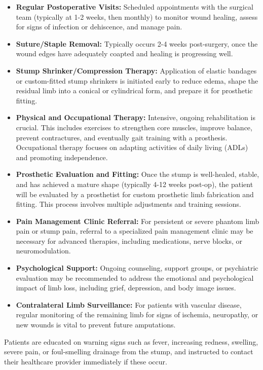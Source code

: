 \begin{itemize}
  \item \textbf{Regular Postoperative Visits:} Scheduled appointments with the surgical team (typically at 1-2 weeks, then monthly) to monitor wound healing, assess for signs of infection or dehiscence, and manage pain.
  \item \textbf{Suture/Staple Removal:} Typically occurs 2-4 weeks post-surgery, once the wound edges have adequately coapted and healing is progressing well.
  \item \textbf{Stump Shrinker/Compression Therapy:} Application of elastic bandages or custom-fitted stump shrinkers is initiated early to reduce edema, shape the residual limb into a conical or cylindrical form, and prepare it for prosthetic fitting.
  \item \textbf{Physical and Occupational Therapy:} Intensive, ongoing rehabilitation is crucial. This includes exercises to strengthen core muscles, improve balance, prevent contractures, and eventually gait training with a prosthesis. Occupational therapy focuses on adapting activities of daily living (ADLs) and promoting independence.
  \item \textbf{Prosthetic Evaluation and Fitting:} Once the stump is well-healed, stable, and has achieved a mature shape (typically 4-12 weeks post-op), the patient will be evaluated by a prosthetist for custom prosthetic limb fabrication and fitting. This process involves multiple adjustments and training sessions.
  \item \textbf{Pain Management Clinic Referral:} For persistent or severe phantom limb pain or stump pain, referral to a specialized pain management clinic may be necessary for advanced therapies, including medications, nerve blocks, or neuromodulation.
  \item \textbf{Psychological Support:} Ongoing counseling, support groups, or psychiatric evaluation may be recommended to address the emotional and psychological impact of limb loss, including grief, depression, and body image issues.
  \item \textbf{Contralateral Limb Surveillance:} For patients with vascular disease, regular monitoring of the remaining limb for signs of ischemia, neuropathy, or new wounds is vital to prevent future amputations.
\end{itemize}
Patients are educated on warning signs such as fever, increasing redness, swelling, severe pain, or foul-smelling drainage from the stump, and instructed to contact their healthcare provider immediately if these occur.

